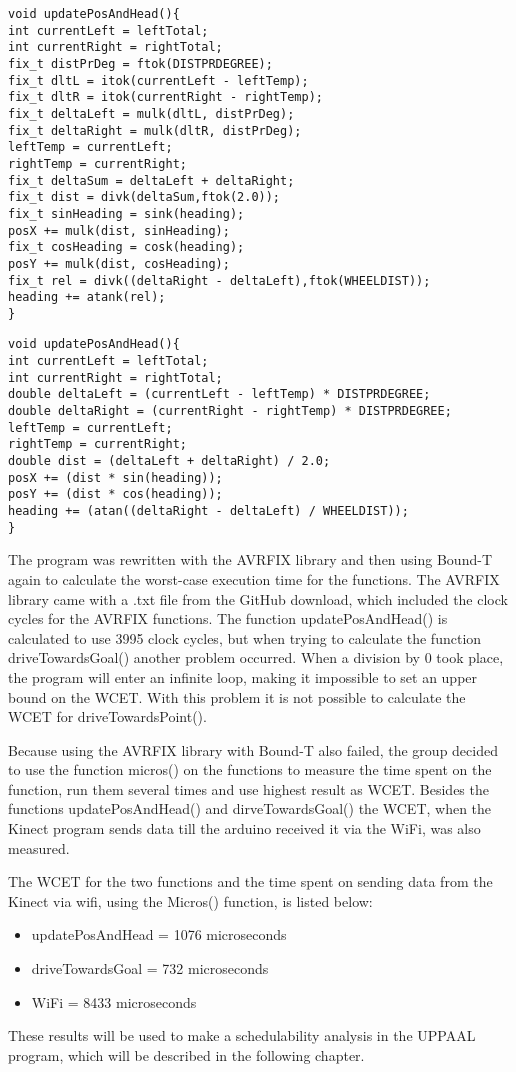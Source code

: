 \begin{lstlisting}[caption={The function updatePosAndHead with AWRFIX library}, label={Update1}]
void updatePosAndHead(){
int currentLeft = leftTotal;
int currentRight = rightTotal;
fix_t distPrDeg = ftok(DISTPRDEGREE);
fix_t dltL = itok(currentLeft - leftTemp);
fix_t dltR = itok(currentRight - rightTemp);
fix_t deltaLeft = mulk(dltL, distPrDeg);
fix_t deltaRight = mulk(dltR, distPrDeg);
leftTemp = currentLeft;
rightTemp = currentRight;
fix_t deltaSum = deltaLeft + deltaRight;
fix_t dist = divk(deltaSum,ftok(2.0));
fix_t sinHeading = sink(heading);
posX += mulk(dist, sinHeading);
fix_t cosHeading = cosk(heading);
posY += mulk(dist, cosHeading);
fix_t rel = divk((deltaRight - deltaLeft),ftok(WHEELDIST));
heading += atank(rel);
}
\end{lstlisting}

\begin{lstlisting}[caption={The function updatePosAndHead from the Arduino IDE}, label={Update2}]
void updatePosAndHead(){
int currentLeft = leftTotal;
int currentRight = rightTotal;
double deltaLeft = (currentLeft - leftTemp) * DISTPRDEGREE;
double deltaRight = (currentRight - rightTemp) * DISTPRDEGREE;
leftTemp = currentLeft;
rightTemp = currentRight;
double dist = (deltaLeft + deltaRight) / 2.0;
posX += (dist * sin(heading));
posY += (dist * cos(heading));
heading += (atan((deltaRight - deltaLeft) / WHEELDIST));
}
\end{lstlisting}

The program was rewritten with the AVRFIX library and then using Bound-T again to calculate the worst-case execution time for the functions. The AVRFIX library came with a .txt file from the GitHub download, which included the clock cycles for the AVRFIX functions. \newline
The function updatePosAndHead() is calculated to use 3995 clock cycles, but when trying to calculate the function driveTowardsGoal() another problem occurred. When a division by 0 took place, the program will enter an infinite loop, making it impossible to set an upper bound on the WCET. With this problem it is not possible to calculate the WCET for driveTowardsPoint().

Because using the AVRFIX library with Bound-T also failed, the group decided to use the function micros() on the functions to measure the time spent on the function, run them several times and use highest result as WCET. Besides the functions updatePosAndHead() and dirveTowardsGoal() the WCET, when the Kinect program sends data till the arduino received it via the WiFi, was also measured. 

The WCET for the two functions and the time spent on sending data from the Kinect via wifi, using the Micros() function, is listed below:
\begin{itemize}
	\item updatePosAndHead = 1076 microseconds
	\item driveTowardsGoal = 732 microseconds
	\item WiFi = 8433 microseconds
\end{itemize}

These results will be used to make a schedulability analysis in the UPPAAL program, which will be described in the following chapter.

